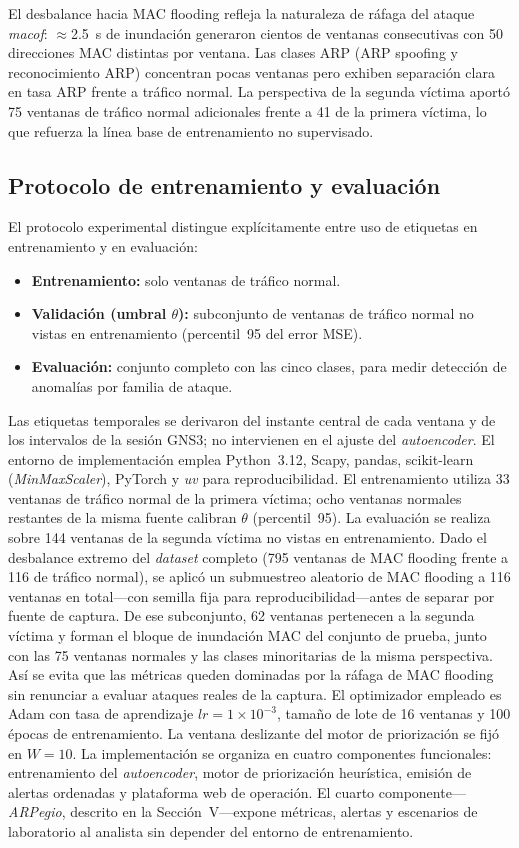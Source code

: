\documentclass[conference]{IEEEtran}
\newcommand{\trafonormal}{tráfico normal}
\newcommand{\arpspoof}{ARP spoofing}
\newcommand{\macflood}{MAC flooding}
\newcommand{\arprecon}{reconocimiento ARP}
\newcommand{\victimauno}{primera víctima}
\newcommand{\victimados}{segunda víctima}
\begin{document}
El desbalance hacia \macflood{} refleja la naturaleza de ráfaga
del ataque \textit{macof}: $\approx$2.5~s de inundación generaron cientos
de ventanas consecutivas con 50 direcciones MAC distintas por ventana.
Las clases ARP (\arpspoof{} y \arprecon) concentran
pocas ventanas pero exhiben separación clara en tasa ARP frente
a \trafonormal. La perspectiva de la \victimados{} aportó 75 ventanas
de \trafonormal{} adicionales frente a 41 de la \victimauno, lo que
refuerza la línea base de entrenamiento no supervisado.

\subsection{Protocolo de entrenamiento y evaluación}
El protocolo experimental distingue explícitamente entre uso de etiquetas
en entrenamiento y en evaluación:
\begin{itemize}
\item \textbf{Entrenamiento:} solo ventanas de \trafonormal.
\item \textbf{Validación (umbral $\theta$):} subconjunto de ventanas de
\trafonormal{} no vistas en entrenamiento (percentil~95 del error MSE).
\item \textbf{Evaluación:} conjunto completo con las cinco clases, para
medir detección de anomalías por familia de ataque.
\end{itemize}
Las etiquetas temporales se derivaron del instante central de cada
ventana y de los intervalos de la sesión GNS3; no intervienen en el
ajuste del \textit{autoencoder}. El entorno de implementación emplea
Python~3.12, Scapy, pandas, scikit-learn (\textit{MinMaxScaler}),
PyTorch y \textit{uv} para reproducibilidad. El entrenamiento utiliza
33 ventanas de \trafonormal{} de la \victimauno; ocho ventanas normales
restantes de la misma fuente calibran $\theta$ (percentil~95). La
evaluación se realiza sobre 144 ventanas de la \victimados{} no vistas
en entrenamiento. Dado el desbalance extremo del \textit{dataset}
completo (795 ventanas de \macflood{} frente a 116 de
\trafonormal), se aplicó un submuestreo aleatorio de \macflood{} a
116 ventanas en total---con semilla fija para reproducibilidad---antes
de separar por fuente de captura. De ese subconjunto, 62 ventanas
pertenecen a la \victimados{} y forman el bloque de inundación MAC del
conjunto de prueba, junto con las 75 ventanas normales y las clases
minoritarias de la misma perspectiva. Así se evita que las métricas
queden dominadas por la ráfaga de \macflood{} sin renunciar a evaluar
ataques reales de la captura. El optimizador empleado es Adam
con tasa de aprendizaje $lr = 1 \times 10^{-3}$, tamaño de lote de 16
ventanas y 100 épocas de entrenamiento. La ventana deslizante del motor
de priorización se fijó en $W = 10$. La implementación se organiza en
cuatro componentes funcionales: entrenamiento del \textit{autoencoder},
motor de priorización heurística, emisión de alertas ordenadas y
plataforma web de operación. El cuarto componente---\textit{ARPegio},
descrito en la Sección~V---expone métricas, alertas y escenarios de
laboratorio al analista sin depender del entorno de entrenamiento.
\end{document}
